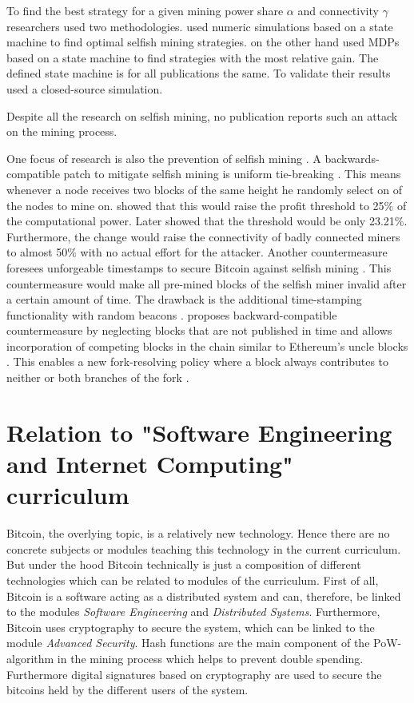\documentclass{scrartcl}
\begin{document}
To find the best strategy for a given mining power share $\alpha$ and connectivity $\gamma$ researchers used two methodologies. \cite{gervais2015tampering, nayak2016stubborn} used numeric simulations based on a state machine to find optimal selfish mining strategies. \cite{sapirshtein2016optimal, gervais2016security} on the other hand used MDPs based on a state machine to find strategies with the most relative gain. The defined state machine is for all publications the same. To validate their results \citep{eyal2014majority, sapirshtein2016optimal} used a closed-source simulation.

Despite all the research on selfish mining, no publication reports such an attack on the mining process.

One focus of research is also the prevention of selfish mining \cite{eyal2014majority, billah2015one, solat2016zeroblock, zhang2017publish}. A backwards-compatible patch to mitigate selfish mining is uniform tie-breaking \cite{eyal2014majority}. This means whenever a node receives two blocks of the same height he randomly select on of the nodes to mine on. \citep{eyal2014majority} showed that this would raise the profit threshold to 25\% of the computational power. Later \citep{sapirshtein2016optimal} showed that the threshold would be only 23.21\%. Furthermore, the change would raise the connectivity of badly connected miners to almost 50\% with no actual effort for the attacker. Another countermeasure foresees unforgeable timestamps to secure Bitcoin against selfish mining \citep{billah2015one}. This countermeasure would make all pre-mined blocks of the selfish miner invalid after a certain amount of time. The drawback is the additional time-stamping functionality with random beacons \citep{billah2015one}. \cite{zhang2017publish} proposes backward-compatible countermeasure by neglecting blocks that are not published in time and allows incorporation of competing blocks in the chain similar to Ethereum's uncle blocks \cite{Ethereum}. This enables a new fork-resolving policy where a block always contributes to neither or both branches of the fork \cite{zhang2017publish}.

\section{Relation to "Software Engineering and Internet Computing" curriculum}
Bitcoin, the overlying topic, is a relatively new technology. Hence there are no concrete subjects or modules teaching this technology in the current curriculum. But under the hood Bitcoin technically is just a composition of different technologies which can be related to modules of the curriculum. First of all, Bitcoin is a software acting as a distributed system and can, therefore, be linked to the modules \textit{Software Engineering} and \textit{Distributed Systems}. Furthermore, Bitcoin uses cryptography to secure the system, which can be linked to the module \textit{Advanced Security}. Hash functions are the main component of the PoW-algorithm in the mining process which helps to prevent double spending. Furthermore digital signatures based on cryptography are used to secure the bitcoins held by the different users of the system.
\end{document}
